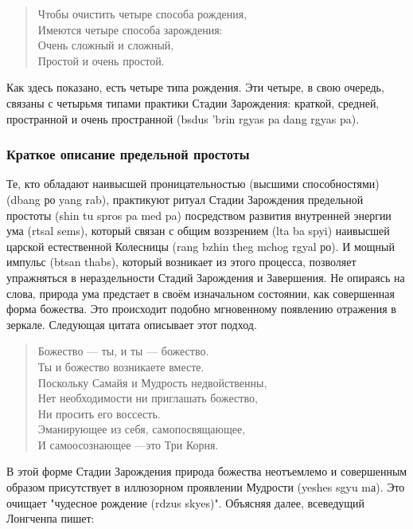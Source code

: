 \begin{verse}
Чтобы очистить четыре способа рождения,\\
Имеются четыре способа зарождения:\\
Очень сложный и сложный,\\
Простой и очень простой.
\end{verse}

\begin{siderules}
Как здесь показано, есть четыре типа рождения. Эти четыре, в свою очередь, связаны с
четырьмя типами практики Стадии Зарождения: краткой, средней, пространной и очень
пространной (bsdus 'brin rgyas pa dang rgyas pa).
\end{siderules}

\newpage
\subsubsection{Краткое описание предельной простоты}

Те, кто обладают наивысшей проницательностью (высшими способностями) (dbang ро
yang rab), практикуют ритуал Стадии Зарождения предельной простоты (shin tu spros pa med
pa) посредством развития внутренней энергии ума (rtsal sems), который связан с общим
воззрением (lta ba spyi) наивысшей царской естественной Колесницы (rang bzhin theg mchog
rgyal ро). И мощный импульс (btsan thabs), который возникает из этого процесса, позволяет
упражняться в нераздельности Стадий Зарождения и Завершения. Не опираясь на слова,
природа ума предстает в своём изначальном состоянии, как совершенная форма божества.
Это происходит подобно мгнове\-нному появлению отражения в зеркале. Следующая цитата
описывает этот подход.

\begin{verse}
Божество — ты, и ты — божество.\\
Ты и божество возникаете вместе.\\
Поскольку Самайя и Мудрость недвойственны,\\
Нет необходимости ни приглашать божество,\\
Ни просить его воссесть.\\
Эманирующее из себя, самопосвящающее,\\
И самоосознающее —это Три Корня.\\
\end{verse}

В этой форме Стадии Зарождения природа божества неотъем\-лемо и совершенным
образом присутствует в иллюзорном проявлении Мудрости (yeshes sgyu mа).
Это очищает "чудесное рождение (rdzus skyes)". Объясняя далее, всеведущий Лонгчен\-па пишет:

